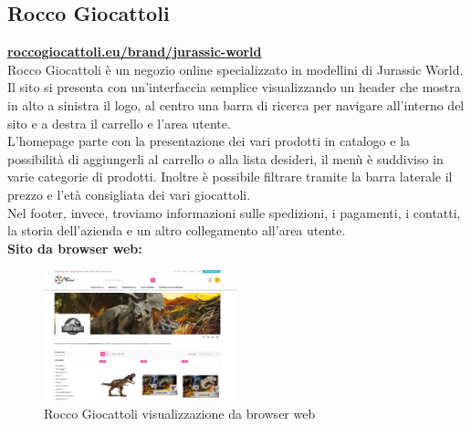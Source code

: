 \subsection{Rocco Giocattoli}
\href{https://shop.roccogiocattoli.eu/brand/jurassic-world}{\textbf{roccogiocattoli.eu/brand/jurassic-world}}
\\
Rocco Giocattoli è un negozio online specializzato in modellini di Jurassic World. Il sito si presenta con un'interfaccia semplice visualizzando un header che mostra in alto a sinistra il logo, al centro una barra di ricerca per navigare all'interno del sito e a destra il carrello e l'area utente.
\\
L'homepage parte con la presentazione dei vari prodotti in catalogo e la possibilità di aggiungerli al carrello o alla lista desideri, il menù è suddiviso in varie categorie di prodotti. Inoltre è possibile filtrare tramite la barra laterale il prezzo e l'età consigliata dei vari giocattoli. 
\\
Nel footer, invece, troviamo informazioni sulle spedizioni, i pagamenti, i contatti, la storia dell'azienda e un altro collegamento all'area utente.
\\

\textbf{Sito da browser web:}
\begin{figure}[H]
        \centering
        \includegraphics[width=0.50\textwidth]{immagini/roccogiocattoli.png}
        \caption{Rocco Giocattoli visualizzazione da browser web}
    \end{figure}
    
